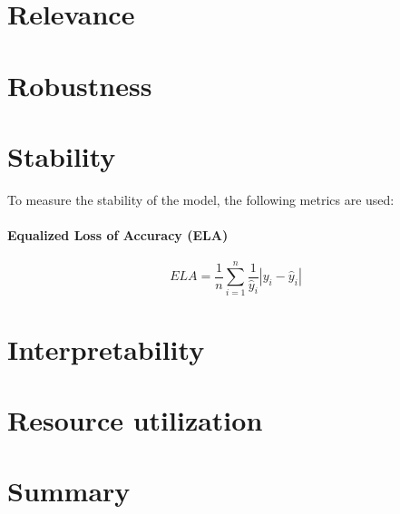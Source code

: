 




\section{Relevance}

\section{Robustness}

\section{Stability}
To measure the stability of the model, the following metrics are used:

\paragraph*{Equalized Loss of Accuracy (ELA)}

\begin{equation}
    \label{eq:ela}
    ELA = \frac{1}{n} \sum_{i=1}^{n} \frac{1}{\hat{y}_i} |y_i - \hat{y}_i|
\end{equation}




\section{Interpretability}

\section{Resource utilization}







\section{Summary}